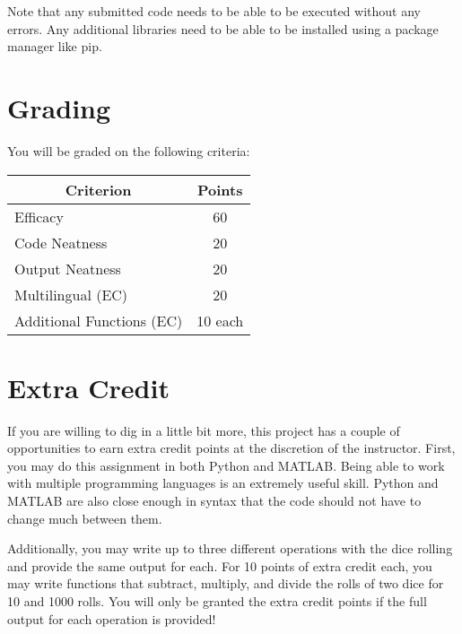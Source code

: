 \documentclass[
	letterpaper, %
	fontsize=10pt, %
	twoside=true, %
	numbers=noenddot, %
]{kaobook}
\begin{document}


Note that any submitted code needs to be able to be executed without any errors. Any additional libraries need to be able to be installed using a package manager like pip.

\section*{Grading}
You will be graded on the following criteria:

\begin{margintable}
    \begin{tabular}{l | c}
        \toprule
        \multicolumn{1}{c|}{\textbf{Criterion}} & \textbf{Points} \\
        \midrule
        Efficacy & 60 \\
        Code Neatness & 20 \\
        Output Neatness & 20 \\
        Multilingual (EC) & 20 \\
        Additional Functions (EC) & 10 each \\
        \bottomrule
    \end{tabular}
\end{margintable}


\section*{Extra Credit}
If you are willing to dig in a little bit more, this project has a couple of opportunities to earn extra credit points at the discretion of the instructor.
First, you may do this assignment in both Python and MATLAB. 
Being able to work with multiple programming languages is an extremely useful skill.
Python and MATLAB are also close enough in syntax that the code should not have to change much between them.

Additionally, you may write up to three different operations with the dice rolling and provide the same output for each.
For 10 points of extra credit each, you may write functions that subtract, multiply, and divide the rolls of two dice for 10 and 1000 rolls.
You will only be granted the extra credit points if the full output for each operation is provided!
\end{document}
